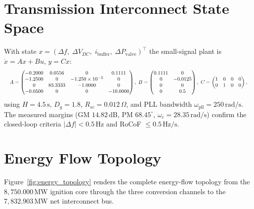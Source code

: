 \documentclass[10pt,journal,compsoc]{IEEEtran}
\newcommand{\MW}{\,\mathrm{MW}}
\begin{document}
\section{Transmission Interconnect State Space}
With state $x = (\Delta f,\; \Delta V_{DC},\; i_{\mathrm{buffer}},\;
\Delta P_{\mathrm{valve}})^\top$ the small-signal plant is
$\dot x = Ax + Bu$, $y = Cx$:
\begin{equation}\resizebox{\columnwidth}{!}{$\displaystyle
A = \begin{pmatrix}
-0.2000 & 0.0556 & 0 & 0.1111\\
-1.2500 & 0 & -1.250\times10^{-3} & 0\\
0 & 83.3333 & -1.0000 & 0\\
-0.0500 & 0 & 0 & -10.0000
\end{pmatrix},\;
B = \begin{pmatrix}
0.1111 & 0\\ 0 & -0.0125\\ 0 & 0\\ 0 & 0.5
\end{pmatrix},\;
C = \begin{pmatrix}
1 & 0 & 0 & 0\\ 0 & 1 & 0 & 0
\end{pmatrix},
$}\end{equation}
using $H = 4.5\,\mathrm{s}$, $D_g = 1.8$, $R_{sc} = 0.012\,\Omega$, and
PLL bandwidth $\omega_{\mathrm{pll}} = 250\,\mathrm{rad/s}$. The
measured margins (GM $14.82\,\mathrm{dB}$, PM $68.45^{\circ}$,
$\omega_c = 28.35\,\mathrm{rad/s}$) confirm the closed-loop criteria
$|\Delta f| < 0.5\,\mathrm{Hz}$ and RoCoF $\le 0.5\,\mathrm{Hz/s}$.


\section{Energy Flow Topology}
Figure~\ref{fig:energy_topology} renders the complete energy-flow
topology from the $8{,}750.000\MW$ ignition core through the three
conversion channels to the $7{,}832.903\MW$ net interconnect bus.
\end{document}
